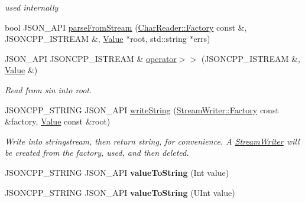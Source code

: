 \begin{DoxyCompactItemize}
\begin{DoxyCompactList}\small\item\em used internally \end{DoxyCompactList}\item 
bool J\+S\+O\+N\+\_\+\+A\+PI \hyperlink{namespaceJson_aab0cf1ecf81d1aeca12be2a416a84352}{parse\+From\+Stream} (\hyperlink{classJson_1_1CharReader_1_1Factory}{Char\+Reader\+::\+Factory} const \&, J\+S\+O\+N\+C\+P\+P\+\_\+\+I\+S\+T\+R\+E\+AM \&, \hyperlink{classJson_1_1Value}{Value} $\ast$root, std\+::string $\ast$errs)
\item 
J\+S\+O\+N\+\_\+\+A\+PI J\+S\+O\+N\+C\+P\+P\+\_\+\+I\+S\+T\+R\+E\+AM \& \hyperlink{namespaceJson_a244ed0996aba750c40c1641c06bba449}{operator$>$$>$} (J\+S\+O\+N\+C\+P\+P\+\_\+\+I\+S\+T\+R\+E\+AM \&, \hyperlink{classJson_1_1Value}{Value} \&)
\begin{DoxyCompactList}\small\item\em Read from \textquotesingle{}sin\textquotesingle{} into \textquotesingle{}root\textquotesingle{}. \end{DoxyCompactList}\item 
J\+S\+O\+N\+C\+P\+P\+\_\+\+S\+T\+R\+I\+NG J\+S\+O\+N\+\_\+\+A\+PI \hyperlink{namespaceJson_a00820c0084189e2a7533531c0f250e3f}{write\+String} (\hyperlink{classJson_1_1StreamWriter_1_1Factory}{Stream\+Writer\+::\+Factory} const \&factory, \hyperlink{classJson_1_1Value}{Value} const \&root)\hypertarget{namespaceJson_a00820c0084189e2a7533531c0f250e3f}{}\label{namespaceJson_a00820c0084189e2a7533531c0f250e3f}

\begin{DoxyCompactList}\small\item\em Write into stringstream, then return string, for convenience. A \hyperlink{classJson_1_1StreamWriter}{Stream\+Writer} will be created from the factory, used, and then deleted. \end{DoxyCompactList}\item 
J\+S\+O\+N\+C\+P\+P\+\_\+\+S\+T\+R\+I\+NG J\+S\+O\+N\+\_\+\+A\+PI {\bfseries value\+To\+String} (Int value)\hypertarget{namespaceJson_a4ed9732688b3c3dcaec309c9baddeac9}{}\label{namespaceJson_a4ed9732688b3c3dcaec309c9baddeac9}

\item 
J\+S\+O\+N\+C\+P\+P\+\_\+\+S\+T\+R\+I\+NG J\+S\+O\+N\+\_\+\+A\+PI {\bfseries value\+To\+String} (U\+Int value)\hypertarget{namespaceJson_a99bc401be7f8a09a8439f3e7219b1f12}{}\label{namespaceJson_a99bc401be7f8a09a8439f3e7219b1f12}


\end{DoxyCompactItemize}
